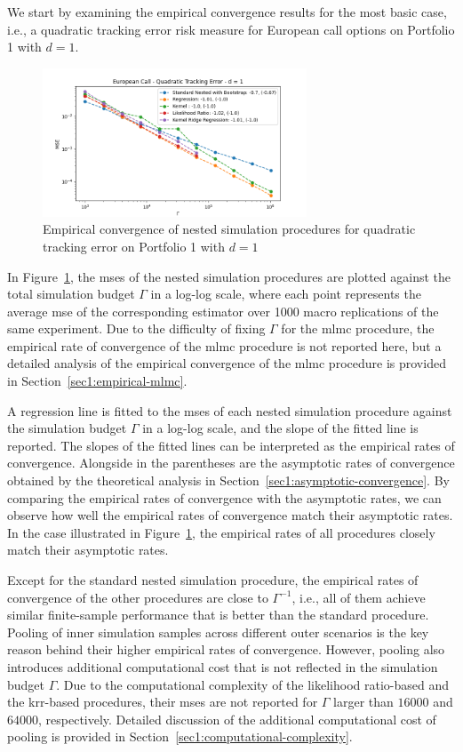 We start by examining the empirical convergence results for the most basic case, i.e., a quadratic tracking error risk measure for European call options on Portfolio 1 with $d = 1$.

\begin{figure}[ht!]
    \centering
    \includegraphics[width=0.7\textwidth]{./project1/figures/figure1.png}
    \caption{Empirical convergence of nested simulation procedures for quadratic tracking error on Portfolio 1 with $d=1$}
\label{fig1:compareAll} 
\end{figure}
In Figure~\ref{fig1:compareAll}, the \gls{mse}s of the nested simulation procedures are plotted against the total simulation budget $\Gamma$ in a log-log scale, where each point represents the average \gls{mse} of the corresponding estimator over \num{1000} macro replications of the same experiment.
Due to the difficulty of fixing $\Gamma$ for the \gls{mlmc} procedure, the empirical rate of convergence of the \gls{mlmc} procedure is not reported here, but a detailed analysis of the empirical convergence of the \gls{mlmc} procedure is provided in Section~\ref{sec1:empirical-mlmc}.

A regression line is fitted to the \gls{mse}s of each nested simulation procedure against the simulation budget $\Gamma$ in a log-log scale, and the slope of the fitted line is reported.
The slopes of the fitted lines can be interpreted as the empirical rates of convergence.
Alongside in the parentheses are the asymptotic rates of convergence obtained by the theoretical analysis in Section~\ref{sec1:asymptotic-convergence}.
By comparing the empirical rates of convergence with the asymptotic rates, we can observe how well the empirical rates of convergence match their asymptotic rates.
In the case illustrated in Figure~\ref{fig1:compareAll}, the empirical rates of all procedures closely match their asymptotic rates.

Except for the standard nested simulation procedure, the empirical rates of convergence of the other procedures are close to $\Gamma^{-1}$, i.e., all of them achieve similar finite-sample performance that is better than the standard procedure.
Pooling of inner simulation samples across different outer scenarios is the key reason behind their higher empirical rates of convergence.
However, pooling also introduces additional computational cost that is not reflected in the simulation budget $\Gamma$.
Due to the computational complexity of the likelihood ratio-based and the \gls{krr}-based procedures, their \gls{mse}s are not reported for $\Gamma$ larger than $\num{16000}$ and $\num{64000}$, respectively.
Detailed discussion of the additional computational cost of pooling is provided in Section~\ref{sec1:computational-complexity}.

